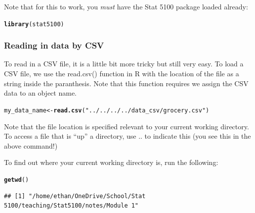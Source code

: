 \documentclass{article}\usepackage[]{graphicx}\usepackage[]{color}
\makeatletter
\newcommand{\hlstr}[1]{\textcolor[rgb]{0.192,0.494,0.8}{#1}}%
\newcommand{\hlstd}[1]{\textcolor[rgb]{0.345,0.345,0.345}{#1}}%
\newcommand{\hlkwb}[1]{\textcolor[rgb]{0.69,0.353,0.396}{#1}}%
\newcommand{\hlkwd}[1]{\textcolor[rgb]{0.737,0.353,0.396}{\textbf{#1}}}%
\newenvironment{kframe}{%
 \def\at@end@of@kframe{}%
 \ifinner\ifhmode%
  \def\at@end@of@kframe{\end{minipage}}%
  \begin{minipage}{\columnwidth}%
 \fi\fi%
 \def\FrameCommand##1{\hskip\@totalleftmargin \hskip-\fboxsep
 \colorbox{shadecolor}{##1}\hskip-\fboxsep
     \hskip-\linewidth \hskip-\@totalleftmargin \hskip\columnwidth}%
 \MakeFramed {\advance\hsize-\width
   \@totalleftmargin\z@ \linewidth\hsize
   \@setminipage}}%
 {\par\unskip\endMakeFramed%
 \at@end@of@kframe}
\newenvironment{knitrout}{}{} %
\makeatother
\begin{document}
Note that for this to work, you \textit{must} have the Stat 5100 package loaded already:

\begin{knitrout}
\color{fgcolor}\begin{kframe}
\begin{alltt}
\hlkwd{library}\hlstd{(stat5100)}
\end{alltt}
\end{kframe}
\end{knitrout}

\subsubsection{Reading in data by CSV}

To read in a CSV file, it is a little bit more tricky but still very easy. To load a CSV file, we use the read.csv() function in R with the location of the file as a string inside the paranthesis. Note that this function requires we assign the CSV data to an object name.

\begin{knitrout}
\color{fgcolor}\begin{kframe}
\begin{alltt}
\hlstd{my_data_name} \hlkwb{<-} \hlkwd{read.csv}\hlstd{(}\hlstr{"../../../../data_csv/grocery.csv"}\hlstd{)}
\end{alltt}
\end{kframe}
\end{knitrout}

Note that the file location is specified relevant to your current working directory. To access a file that is ``up'' a directory, use .. to indicate this (you see this in the above command!)

To find out where your current working directory is, run the following:

\begin{knitrout}
\color{fgcolor}\begin{kframe}
\begin{alltt}
\hlkwd{getwd}\hlstd{()}
\end{alltt}
\begin{verbatim}
## [1] "/home/ethan/OneDrive/School/Stat 5100/teaching/Stat5100/notes/Module 1"
\end{verbatim}
\end{kframe}
\end{knitrout}
\end{document}
